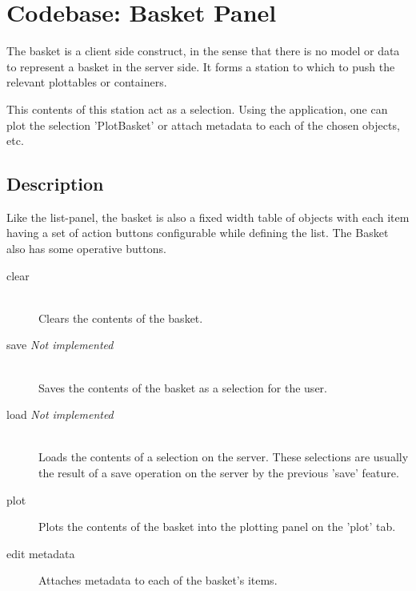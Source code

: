 \chapter{Codebase: Basket Panel}

The basket is a client side construct, in the sense that there is no
model or data to represent a basket in the server side.  It forms a 
station to which to push the relevant plottables or containers.

This contents of this station act as a selection.  Using the
application, one can plot the selection 'PlotBasket' or attach
metadata to each of the chosen objects, etc.

\section{Description}

Like the list-panel, the basket is also a fixed width table of objects
with each item having a set of action buttons configurable while
defining the list.  The Basket also has some operative buttons.

\begin{description}
  \item[clear] \hfill \\
  Clears the contents of the basket.

  \item[save \emph{Not implemented}] \hfill \\
  Saves the contents of the basket as a selection for the user.

  \item[load \emph{Not implemented}] \hfill \\
  Loads the contents of a selection on the server.  These selections
  are usually the result of a save operation on the server by the
  previous 'save' feature.

  \item[plot]
  Plots the contents of the basket into the plotting panel on the
  'plot' tab.

  \item[edit metadata]
  Attaches metadata to each of the basket's items.
\end{description}

